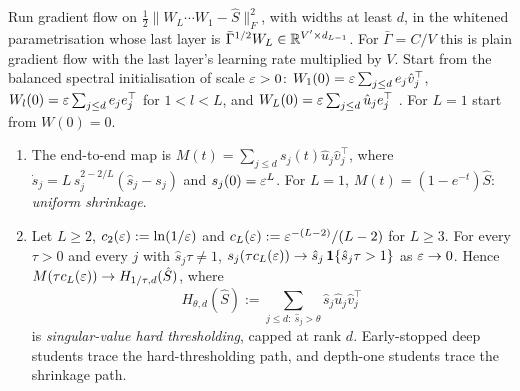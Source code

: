 \begin{proposition}\label{prop:flow}
\Pv\Ck Run gradient flow on $\frac12\|W_L\cdots W_1-\hat S\|_F^2$, with widths at least $d$, in the whitened parametrisation
whose last layer is $\bar\Gamma^{1/2}W_L\in\mathbb{R}^{V'\times d_{L-1}}$. For $\bar\Gamma=C/V$ this is plain gradient flow with the
last layer's learning rate multiplied by $V$. Start from the
balanced spectral initialisation of scale $\varepsilon>0$: $W_1(0)=\varepsilon\sum_{j\le d}e_j\hat v_j^\top$, $W_l(0)=\varepsilon\sum_{j\le d}e_je_j^\top$ for
$1<l<L$, and $W_L(0)=\varepsilon\sum_{j\le d}\hat u_je_j^\top$ \citep{saxe2014exact}. For $L=1$ start from $W(0)=0$.
\begin{enumerate}[label=(\alph*),nosep,leftmargin=*]
\item The end-to-end map is $M(t)=\sum_{j\le d}s_j(t)\hat u_j\hat v_j^\top$, where $\dot s_j=L\,s_j^{2-2/L}(\hat s_j-s_j)$ and $s_j(0)=\varepsilon^L$.
For $L=1$, $M(t)=(1-e^{-t})\hat S$: \emph{uniform shrinkage}.
\item Let $L\ge2$, $c_2(\varepsilon):=\ln(1/\varepsilon)$ and $c_L(\varepsilon):=\varepsilon^{-(L-2)}/(L-2)$ for $L\ge3$. For every $\tau>0$ and every $j$
with $\hat s_j\tau\ne1$, $s_j(\tau c_L(\varepsilon))\to\hat s_j\,\mathbf{1}\{\hat s_j\tau>1\}$ as $\varepsilon\to0$. Hence
$M(\tau c_L(\varepsilon))\to H_{1/\tau,d}(\hat S)$, where
\[
H_{\theta,d}(\hat S):=\sum_{j\le d:\ \hat s_j>\theta}\hat s_j\hat u_j\hat v_j^\top
\]
is \emph{singular-value hard thresholding}, capped at rank $d$. Early-stopped deep students trace the
hard-thresholding path, and depth-one students trace the shrinkage path.
\end{enumerate}
\end{proposition}

